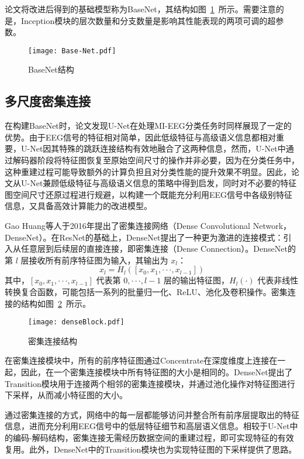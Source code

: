 论文将改进后得到的基础模型称为BaseNet，其结构如图~\ref{fig:BaseNet}~所示。需要注意的是，Inception模块的层次数量和分支数量是影响其性能表现的两项可调的超参数。
\begin{figure}
    \centering
    \texttt{[image: Base-Net.pdf]}
    \caption{BaseNet结构}
    \label{fig:BaseNet}
\end{figure}

\subsection{多尺度密集连接}

在构建BaseNet时，论文发现U-Net在处理MI-EEG分类任务时同样展现了一定的优势。由于EEG信号的特征相对简单，因此低级特征与高级语义信息都相对重要，U-Net因其特殊的跳跃连接结构有效地融合了这两种信息，然而，U-Net中通过解码器阶段将特征图恢复至原始空间尺寸的操作并非必要，因为在分类任务中，这种重建过程可能导致额外的计算负担且对分类性能的提升效果不明显。因此，论文从U-Net兼顾低级特征与高级语义信息的策略中得到启发，同时对不必要的特征图空间尺寸还原过程进行规避，以构建一个既能充分利用EEG信号中各级别特征信息，又具备高效计算能力的改进模型。

Gao Huang等人于2016年提出了密集连接网络\cite{huang2017densely}（Dense Convolutional Network，DenseNet）。在ResNet的基础上，DenseNet提出了一种更为激进的连接模式：引入从任意层到后续层的直接连接，即密集连接（Dense Connection）。DenseNet的第 \(l\) 层接收所有前序特征图为输入，其输出为 \(x_l\)：
\begin{equation}
  x_l = H_l([x_0, x_1, ···, x_{l-1}])
  \label{eq:dense-conn}
\end{equation}
其中，\([x_0, x_1, ···, x_{l-1}]\) 代表第 \(0, ···, l-1\) 层的输出特征图，\(H_l(·)\) 代表非线性转换复合函数，可能包括一系列的批量归一化、ReLU、池化及卷积操作。密集连接的结构如图~\ref{fig:denseBlock}~所示。
\begin{figure}
  \centering
  \texttt{[image: denseBlock.pdf]}
  \caption{密集连接结构\cite{huang2017densely}}
  \label{fig:denseBlock}
\end{figure}

在密集连接模块中，所有的前序特征图通过Concentrate在深度维度上连接在一起，因此，在一个密集连接模块中所有特征图的大小是相同的。DenseNet提出了Transition模块用于连接两个相邻的密集连接模块，并通过池化操作对特征图进行下采样，从而减小特征图的大小。

通过密集连接的方式，网络中的每一层都能够访问并整合所有前序层提取出的特征信息，进而充分利用EEG信号中的低层特征细节和高层语义信息。相较于U-Net中的编码-解码结构，密集连接无需经历数据空间的重建过程，即可实现特征的有效复用。此外，DenseNet中的Transition模块也为实现特征图的下采样提供了思路。

